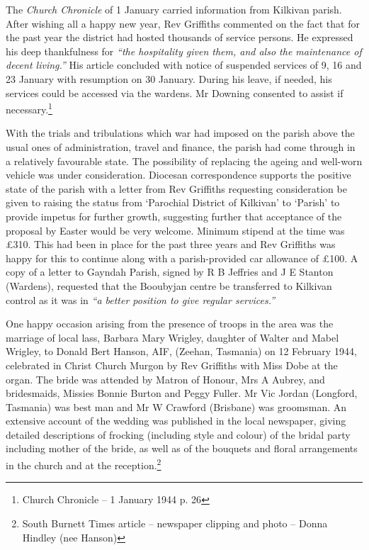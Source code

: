 The \emph{Church Chronicle} of 1 January carried information from Kilkivan parish. After wishing all a happy new year, Rev Griffiths commented on the fact that for the past year the district had hosted thousands of service persons. He expressed his deep thankfulness for \emph{``the hospitality given them, and also the maintenance of decent living.''} His article concluded with notice of suspended services of 9, 16 and 23 January with resumption on 30 January. During his leave, if needed, his services could be accessed via the wardens. Mr Downing consented to assist if necessary.\footnote{Church Chronicle -- 1 January 1944 p. 26}


With the trials and tribulations which war had imposed on the parish above the usual ones of administration, travel and finance, the parish had come through in a relatively favourable state. The possibility of replacing the ageing and well-worn vehicle was under consideration. Diocesan correspondence supports the positive state of the parish with a letter from Rev Griffiths requesting consideration be given to raising the status from `Parochial District of Kilkivan' to `Parish' to provide impetus for further growth, suggesting further that acceptance of the proposal by Easter would be very welcome. Minimum stipend at the time was \pounds310. This had been in place for the past three years and Rev Griffiths was happy for this to continue along with a parish-provided car allowance of \pounds100. A copy of a letter to Gayndah Parish, signed by R B Jeffries and J E Stanton (Wardens), requested that the Booubyjan centre be transferred to Kilkivan control as it was in \emph{``a better position to give regular services.''}



One happy occasion arising from the presence of troops in the area was the marriage of local lass, Barbara Mary Wrigley, daughter of Walter and Mabel Wrigley, to Donald Bert Hanson, AIF, (Zeehan, Tasmania) on 12 February 1944, celebrated in Christ Church Murgon by Rev Griffiths with Miss Dobe at the organ. The bride was attended by Matron of Honour, Mrs A Aubrey, and bridesmaids, Missies Bonnie Burton and Peggy Fuller. Mr Vic Jordan (Longford, Tasmania) was best man and Mr W Crawford (Brisbane) was groomsman. An extensive account of the wedding was published in the local newspaper, giving detailed descriptions of frocking (including style and colour) of the bridal party including mother of the bride, as well as of the bouquets and floral arrangements in the church and at the reception.\footnote{South Burnett Times article -- newspaper clipping and photo -- Donna Hindley (nee Hanson)}








